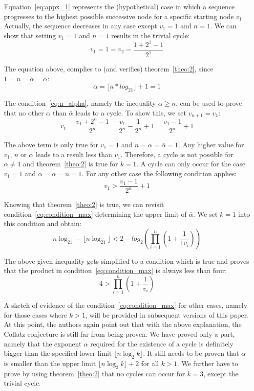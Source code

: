 Equation~\ref{eq:appx_1} represents the (hypothetical) case in which a sequence progresses to the highest possible successive node for a specific starting node $v_1$. Actually, the sequence decreases in any case except $v_1=1$ and $n=1$. We can show that setting $v_1=1$ and $n=1$ results in the trivial cycle:
\[
v_1=1=v_2=\frac{1+2^1-1}{2^1}
\]

The equation above, complies to (and verifies) theorem~\ref{theo:2}, since $1=n=\alpha=\bar\alpha$:
\[
\bar\alpha=\lfloor n*log_21\rfloor+1=1
\]

The condition~\ref{eq:n_alpha}, namely the inequality $\alpha\ge n$, can be used to prove that no other $\alpha$ than $\bar\alpha$ leads to a cycle. To show this, we set $v_{n+1}=v_1$:
\[
v_1=\frac{v_1+2^n-1}{2^n}=\frac{v_1}{2^n}-\frac{1}{2^n}+1=\frac{v_1-1}{2^n}+1
\]

The above term is only true for $v_1=1$ and $n=\alpha=\bar\alpha=1$. Any higher value for $v_1$, $n$ or $\alpha$ leads to a result less than $v_1$. Therefore, a cycle is not possible for $\alpha\ne 1$ and theorem~\ref{theo:2} is true for $k=1$. A cycle can only occur for the case $v_1=1$ and $\alpha=\bar\alpha=n=1$. For any other case the following condition applies:
\[
v_1>\frac{v_1-1}{2^n}+1
\]

Knowing that theorem~\ref{theo:2} is true, we can revisit condition~\ref{eq:condition_max} determining the upper limit of $\bar\alpha$. We set $k=1$ into this condition and obtain:
\begin{equation}
n\log_21-\lfloor n\log_21\rfloor<2-log_2\left(\prod_{i=1}^{n}\left(1+\frac{1}{1v_{i}}\right)\right)
\end{equation}

The above given inequality gets simplified to a condition which is true and proves that the product in condition~\ref{eq:condition_max} is always less than four:
\[
4>\prod_{i=1}^{n}\left(1+\frac{1}{v_{i}}\right)
\]

\par
A sketch of evidence of the condition~\ref{eq:condition_max} for other cases, namely for those cases where $k>1$, will be provided in subsequent versions of this paper. At this point, the authors again point out that with the above explanation, the Collatz conjecture is still far from being proven. We have proved only a part, namely that the exponent $\alpha$ required for the existence of a cycle is definitely bigger than the specified lower limit $\lfloor n\log_2k\rfloor$. It still needs to be proven that $\alpha$ is smaller than the upper limit $\lfloor n\log_2k\rfloor+2$ for all $k>1$. We further have to prove by using theorem~\ref{theo:2} that no cycles can occur for $k=3$, except the trivial cycle.


